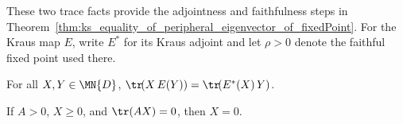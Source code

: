 These two trace facts provide the adjointness and faithfulness steps in
Theorem~\ref{thm:ks_equality_of_peripheral_eigenvector_of_fixedPoint}. For the
Kraus map $E$, write $E^*$ for its Kraus adjoint and let $\rho>0$ denote the
faithful fixed point used there.

\begin{lemma}\label{lem:trace_mul_map_eq_trace_adjointMap_mul}
    \leanok
    For all $X, Y \in \MN{D}$,
    $\tr\!(X\,E(Y)) = \tr\!(E^*(X)\,Y)$.
\end{lemma}

\begin{lemma}\label{lem:posSemidef_eq_zero_of_posDef_trace_mul_eq_zero}
    \leanok
    If $A > 0$, $X \ge 0$, and $\tr(A X) = 0$, then $X = 0$.
\end{lemma}
